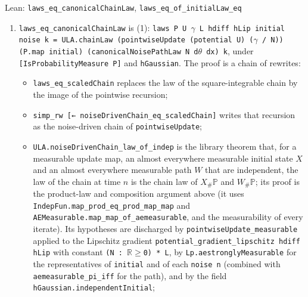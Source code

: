 \documentclass[11pt,a4paper]{report}
\begin{document}
\begin{leanbox}{Lean: \texttt{laws\_\allowbreak{}eq\_\allowbreak{}canonicalChainLaw}, \texttt{laws\_\allowbreak{}eq\_\allowbreak{}of\_\allowbreak{}initialLaw\_\allowbreak{}eq}}
\begin{enumerate}


\item \texttt{laws\_\allowbreak{}eq\_\allowbreak{}canonical\allowbreak{}Chain\allowbreak{}Law} is (1): \texttt{laws P U \ensuremath{\gamma} L hdiff h\allowbreak{}Lip initial noise k = ULA.\allowbreak{}chain\allowbreak{}Law (pointwise\allowbreak{}Update (potential U) (\ensuremath{\gamma} /\allowbreak{} N)) (P.\allowbreak{}map initial) (canonical\allowbreak{}Noise\allowbreak{}Path\allowbreak{}Law N d\ensuremath{\theta} dx) k}, under \texttt{[Is\allowbreak{}Probability\allowbreak{}Measure P]} and \texttt{h\allowbreak{}Gaussian}. The proof is a chain of rewrites:

\begin{itemize}


\item \texttt{laws\_\allowbreak{}eq\_\allowbreak{}scaled\allowbreak{}Chain} replaces the law of the square-integrable chain by the image of the pointwise recursion;

\item \texttt{simp\_\allowbreak{}rw [← noise\allowbreak{}Driven\allowbreak{}Chain\_\allowbreak{}eq\_\allowbreak{}scaled\allowbreak{}Chain]} writes that recursion as the noise-driven chain of \texttt{pointwise\allowbreak{}Update};

\item \texttt{ULA.\allowbreak{}noise\allowbreak{}Driven\allowbreak{}Chain\_\allowbreak{}law\_\allowbreak{}of\_\allowbreak{}indep} is the library theorem that, for a measurable update map, an almost everywhere measurable initial state \(X\) and an almost everywhere measurable path \(W\) that are independent, the law of the chain at time \(n\) is the chain law of \(X_\#\mathbb P\) and \(W_\#\mathbb P\); its proof is the product-law and composition argument above (it uses \texttt{Indep\allowbreak{}Fun.\allowbreak{}map\_\allowbreak{}prod\_\allowbreak{}eq\_\allowbreak{}prod\_\allowbreak{}map\_\allowbreak{}map} and \texttt{AEMeasurable.\allowbreak{}map\_\allowbreak{}map\_\allowbreak{}of\_\allowbreak{}aemeasurable}, and the measurability of every iterate). Its hypotheses are discharged by \texttt{pointwise\allowbreak{}Update\_\allowbreak{}measurable} applied to the Lipschitz gradient \texttt{potential\_\allowbreak{}gradient\_\allowbreak{}lipschitz hdiff h\allowbreak{}Lip} with constant \texttt{(N : \ensuremath{\mathbb R}\ensuremath{\ge}0) * L}, by \texttt{Lp.\allowbreak{}aestrongly\allowbreak{}Measurable} for the representatives of \texttt{initial} and of each \texttt{noise n} (combined with \texttt{aemeasurable\_\allowbreak{}pi\_\allowbreak{}iff} for the path), and by the field \texttt{h\allowbreak{}Gaussian.\allowbreak{}independent\allowbreak{}Initial};


\end{itemize}
\end{enumerate}
\end{leanbox}
\end{document}
